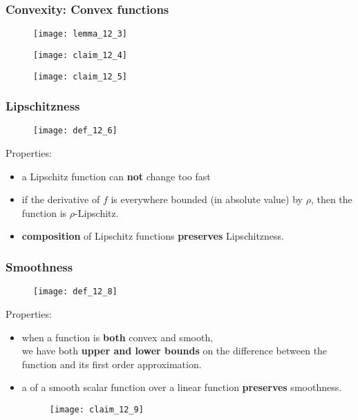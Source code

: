 \begin{frame}
\frametitle{Convexity: Convex functions}

\begin{figure}
    \centering
    \texttt{[image: lemma\_12\_3]}
\end{figure}

\noindent\makebox[\linewidth]{\rule{\paperwidth}{0.4pt}}

\begin{figure}
    \centering
    \texttt{[image: claim\_12\_4]}
\end{figure}

\noindent\makebox[\linewidth]{\rule{\paperwidth}{0.4pt}}

\begin{figure}
    \centering
    \texttt{[image: claim\_12\_5]}
\end{figure}

\end{frame}


\begin{frame}
\frametitle{Lipschitzness}
\begin{figure}
    \centering
    \texttt{[image: def\_12\_6]}
\end{figure}

Properties:
\begin{itemize}
    \item a Lipschitz function can \textbf{not} change too fast
    \item if the derivative of $f$ is everywhere bounded (in absolute value) by $\rho$,
        then the function is $\rho$-Lipschitz.
    \item \textbf{composition} of Lipschitz functions \textbf{preserves} Lipschitzness.
\end{itemize}

\end{frame}


\begin{frame}
\frametitle{Smoothness}
\begin{figure}
    \centering
    \texttt{[image: def\_12\_8]}
\end{figure}

Properties:
\begin{itemize}
    \item when a function is \textbf{both} convex and smooth,\\
        we have both \textbf{upper and lower bounds} on the difference between
        the function and its first order approximation.
    \item a  of a smooth scalar function over a linear function \textbf{preserves} smoothness.
    \begin{figure}
        \centering
        \texttt{[image: claim\_12\_9]}
    \end{figure}
\end{itemize}

\end{frame}

